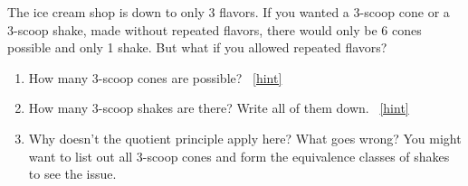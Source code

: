\documentclass{book}
\begin{document}
\setcounter{project}{119}
\addtocounter{project}{-1}
\begin{activity}[]\label{activity-112}
\hypertarget{p-841}{}%
The ice cream shop is down to only 3 flavors.  If you wanted a 3-scoop cone or a 3-scoop shake, made without repeated flavors, there would only be 6 cones possible and only 1 shake.  But what if you allowed repeated flavors?%
\begin{enumerate}[font=\bfseries,label=(\alph*),ref=\alph*]
\item\label{task-153} \hypertarget{p-842}{}%
How many 3-scoop cones are possible?%
~\hfill{\tiny\hyperlink{a-119.a}{[hint]}\hypertarget{q-119.a}{}}\item\label{task-154} \hypertarget{p-844}{}%
How many 3-scoop shakes are there?  Write all of them down.%
~\hfill{\tiny\hyperlink{a-119.b}{[hint]}\hypertarget{q-119.b}{}}\item\label{task-155} \hypertarget{p-846}{}%
Why doesn't the quotient principle apply here?  What goes wrong?  You might want to list out all 3-scoop cones and form the equivalence classes of shakes to see the issue.%
\end{enumerate}
\end{activity}
\end{document}
